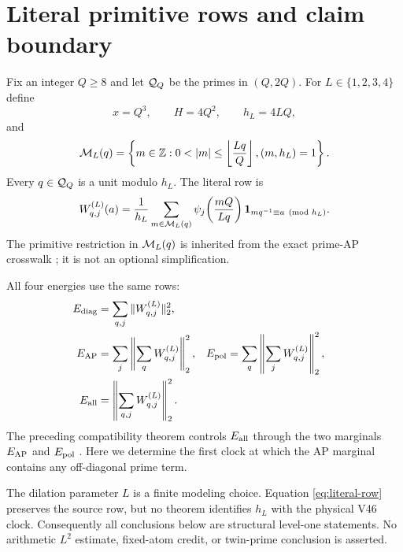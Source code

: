 \section{Literal primitive rows and claim boundary}

Fix an integer $Q\ge8$ and let $\mathcal Q_Q$ be the primes in $(Q,2Q)$.  For
$L\in\{1,2,3,4\}$ define
\[
 x=Q^3,\qquad H=4Q^2,\qquad h_L=4LQ,
\]
and
\[
 \Mset_L(q)=\left\{m\in\mathbb Z:
 0<|m|\le \left\lfloor\frac{Lq}{Q}\right\rfloor,
 (m,h_L)=1\right\}.
\]
Every $q\in\mathcal Q_Q$ is a unit modulo $h_L$.  The literal row is
\begin{equation}
 W_{q,j}^{(L)}(a)=\frac1{h_L}
 \sum_{m\in\mathcal M_L(q)}
 \psi_j\!\left(\frac{mQ}{Lq}\right)
 \mathbf 1_{m q^{-1}\equiv a\pmod{h_L}}.
 \label{eq:literal-row}
\end{equation}
The primitive restriction in $\mathcal M_L(q)$ is inherited from the exact prime-AP
crosswalk \cite{tpc220}; it is not an optional simplification.

All four energies use the same rows:
\begin{align}
 E_{\mathrm{diag}}&=\sum_{q,j}\|W_{q,j}^{(L)}\|_2^2,\nonumber\\
 E_{\mathrm{AP}}&=\sum_j\left\|\sum_qW_{q,j}^{(L)}\right\|_2^2,
 &
 E_{\mathrm{pol}}&=\sum_q\left\|\sum_jW_{q,j}^{(L)}\right\|_2^2,\nonumber\\
 E_{\mathrm{all}}&=\left\|\sum_{q,j}W_{q,j}^{(L)}\right\|_2^2.
 \label{eq:energies}
\end{align}
The preceding compatibility theorem controls $E_{\mathrm{all}}$ through the two marginals
$E_{\mathrm{AP}}$ and $E_{\mathrm{pol}}$ \cite{tpc224}.  Here we determine the first clock at which the AP
marginal contains any off-diagonal prime term.

The dilation parameter $L$ is a finite modeling choice.  Equation
\eqref{eq:literal-row} preserves the source row, but no theorem identifies $h_L$ with
the physical V46 clock.  Consequently all conclusions below are structural level-one
statements.  No arithmetic $L^2$ estimate, fixed-atom credit, or twin-prime conclusion
is asserted.
